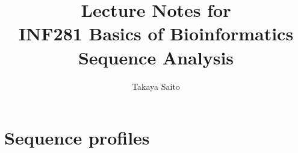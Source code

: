 \documentclass[12pt]{article}
\title{Lecture Notes for \\ INF281 Basics of Bioinformatics Sequence Analysis}
\author{Takaya Saito}
\date{}
\begin{document}
\setcounter{page}{88}

\makeatletter 
\renewcommand{\thefigure}{\arabic{section}.\arabic{figure}}
\renewcommand{\thetable}{\arabic{section}.\arabic{table}}
\makeatother

%
%
\setcounter{section}{11}
\setcounter{figure}{0}
\setcounter{table}{0}
\section{Sequence profiles}





\end{document}
